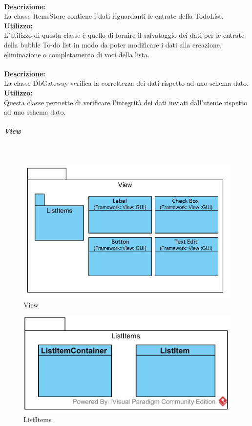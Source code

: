 \label{todo-itemsStore}\mbox{}\\
\textbf{Descrizione:}\\
La classe ItemsStore contiene i dati riguardanti le entrate della TodoList.\\
\textbf{Utilizzo:}\\
L'utilizzo di questa classe è quello di fornire il salvataggio dei dati per le entrate della bubble To-do list in modo da poter modificare i dati alla creazione, eliminazione o completamento di voci della lista.\\

\label{todo-gateway}\mbox{}\\
\textbf{Descrizione:}\\
La classe Db\-Gateway verifica la correttezza dei dati rispetto ad uno schema dato.\\
\textbf{Utilizzo:}\\
Questa classe permette di verificare l'integrità dei dati inviati dall'utente rispetto ad uno schema dato.

\subparagraph{View}\mbox{}\\
\nopagebreak
\begin{figure}[H]
	\centering
	\includegraphics[width=14cm]{../../documenti/SpecificaTecnica/diagrammi_img/classi_e_package/todo_view.png}
	\caption{View}
\end{figure}

\begin{figure}[H]
	\centering
	\includegraphics[width=14cm]{../../documenti/SpecificaTecnica/diagrammi_img/classi_e_package/todo_listitems.png}
	\caption{List\-Items}
\end{figure}

